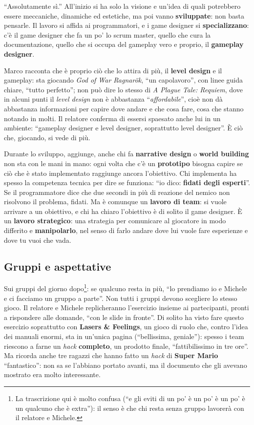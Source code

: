 ``Assolutamente sì.'' All'inizio si ha solo la visione e un'idea di quali
potrebbero essere meccaniche, dinamiche ed estetiche, ma poi vanno
\textbf{sviluppate}: non basta pensarle. Il lavoro si affida ai programmatori, e i
game designer si \textbf{specializzano}: c'è il game designer che fa un po' lo
scrum master, quello che cura la documentazione, quello che si occupa del gameplay
vero e proprio, il \textbf{gameplay designer}.

Marco racconta che è proprio ciò che lo attira di più, il \textbf{level design} e
il gameplay: sta giocando \emph{God of War Ragnarök}, ``un capolavoro'', con linee
guida chiare, ``tutto perfetto''; non può dire lo stesso di \emph{A Plague Tale:
Requiem}, dove in alcuni punti il \emph{level design} non è abbastanza
``\emph{affordabile}'', cioè non dà abbastanza informazioni per capire dove andare
e che cosa fare, cosa che stanno notando in molti. Il relatore conferma di essersi
spaesato anche lui in un ambiente: ``gameplay designer e level designer,
soprattutto level designer''. È ciò che, giocando, si vede di più.

Durante lo sviluppo, aggiunge, anche chi fa \textbf{narrative design} o
\textbf{world building} non sta con le mani in mano: ogni volta che c'è un
\textbf{prototipo} bisogna capire se ciò che è stato implementato raggiunge ancora
l'obiettivo. Chi implementa ha spesso la competenza tecnica per dire se funziona:
``io dico: \textbf{fidati degli esperti}''. Se il programmatore dice che due
secondi in più di reazione del nemico non risolvono il problema, fidati. Ma è
comunque un \textbf{lavoro di team}: si vuole arrivare a un obiettivo, e chi ha
chiaro l'obiettivo è di solito il game designer. È un \textbf{lavoro strategico}:
una strategia per comunicare al giocatore in modo differito e
\textbf{manipolarlo}, nel senso di farlo andare dove lui vuole fare esperienze e
dove tu vuoi che vada.

\subsection{Gruppi e aspettative}

Sui gruppi del giorno dopo\footnote{La trascrizione qui è molto confusa (``e gli
eviti di un po' è un po' è un po' è un qualcuno che è extra''): il senso è che chi
resta senza gruppo lavorerà con il relatore e Michele.}: se qualcuno resta in
più, ``lo prendiamo io e Michele e ci facciamo un gruppo a parte''. Non tutti i
gruppi devono scegliere lo stesso gioco. Il relatore e Michele replicheranno
l'esercizio insieme ai partecipanti, pronti a rispondere alle domande, ``con le
slide in fronte''. Di solito ha visto fare questo esercizio soprattutto con
\textbf{Lasers \& Feelings}, un gioco di ruolo che, contro l'idea dei manuali
enormi, sta in un'unica pagina (``bellissima, geniale''): spesso i team riescono a
farne un \emph{hack} \textbf{completo}, un prodotto finale, ``fattibilissimo in tre
ore''. Ma ricorda anche tre ragazzi che hanno fatto un \emph{hack} di \textbf{Super
Mario} ``fantastico'': non sa se l'abbiano portato avanti, ma il documento che gli
avevano mostrato era molto interessante.

